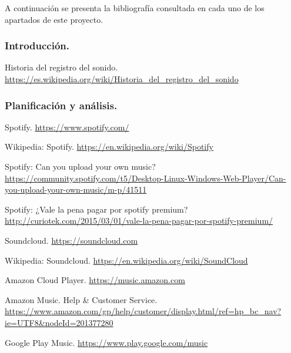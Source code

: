 \label{cap:bibliografia}

\begin{bibcomment}
A continuación se presenta la bibliografía consultada en cada uno de los apartados de este proyecto.
\end{bibcomment}

\subsubsection*{Introducción.}

 Historia del registro del sonido. \url{https://es.wikipedia.org/wiki/Historia_del_registro_del_sonido}

\subsubsection*{Planificación y análisis.}

 Spotify. \url{https://www.spotify.com/}

 Wikipedia: Spotify. \url{https://en.wikipedia.org/wiki/Spotify}

 Spotify: Can you upload your own music? \url{https://community.spotify.com/t5/Desktop-Linux-Windows-Web-Player/Can-you-upload-your-own-music/m-p/41511}

 Spotify: ¿Vale la pena pagar por spotify premium? \url{http://curiotek.com/2015/03/01/vale-la-pena-pagar-por-spotify-premium/}

 Soundcloud. \url{https://soundcloud.com}

 Wikipedia: Soundcloud. \url{https://en.wikipedia.org/wiki/SoundCloud}

 Amazon Cloud Player. \url{https://music.amazon.com}

 Amazon Music. Help \& Customer Service. \url{https://www.amazon.com/gp/help/customer/display.html/ref=hp_bc_nav?ie=UTF8&nodeId=201377280}

 Google Play Music. \url{https://www.play.google.com/music}

